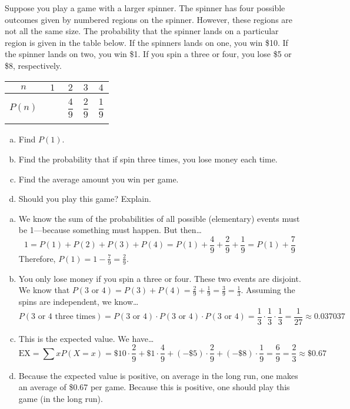 \documentclass[11pt,letterpaper]{article}
\begin{document}

 Suppose you play a game with a larger spinner. The spinner has four possible outcomes given by numbered regions on the spinner. However, these regions are not all the same size. The probability that the spinner lands on a particular region is given in the table below. If the spinners lands on one, you win \$10. If the spinner lands on two, you win \$1. If you spin a three or four, you lose \$5 or \$8, respectively. 
	\begin{table}[!ht]
	\centering 
	\begin{tabular}{|c||c|c|c|c|} \hline 
	$n$ & $1$ & $2$ & $3$ & $4$ \\ \hline 
	$P(n)$ & $\phantom{\dfrac{4\rule{0pt}{2.9ex}}{12\rule[-1.3ex]{0pt}{0pt}}}$ & $\dfrac{4}{9}$ & $\dfrac{2}{9}$ & $\dfrac{1}{9}$ \\ \hline
	\end{tabular}
	\end{table}

\begin{enumerate}[(a)]
\item Find $P(1)$.
\item Find the probability that if spin three times, you lose money each time. 
\item Find the average amount you win per game.
\item Should you play this game? Explain. 
\end{enumerate} \pspace

\sol 
\begin{enumerate}[(a)]
\item We know the sum of the probabilities of all possible (elementary) events must be 1---because something must happen. But then\dots
	\[
	1= P(1) + P(2) + P(3) + P(4)= P(1) + \dfrac{4}{9} + \dfrac{2}{9} + \dfrac{1}{9}= P(1) + \dfrac{7}{9}
	\]
Therefore, $P(1)= 1 - \frac{7}{9}= \frac{2}{9}$. \pspace 

\item You only lose money if you spin a three or four. These two events are disjoint. We know that $P(3 \text{ or } 4)= P(3) + P(4)= \frac{2}{9} + \frac{1}{9}= \frac{3}{9}= \frac{1}{3}$. Assuming the spins are independent, we know\dots
	\[
	P(\text{3 or 4 three times})= P(3 \text{ or } 4) \cdot P(3 \text{ or } 4) \cdot P(3 \text{ or } 4)= \dfrac{1}{3} \cdot \dfrac{1}{3} \cdot \dfrac{1}{3}= \dfrac{1}{27} \approx 0.037037
	\] \pspace

\item This is the expected value. We have\dots
	\[
	\text{EX}= \sum x P(X= x)= \$10 \cdot \dfrac{2}{9} + \$1 \cdot \dfrac{4}{9} + (-\$5) \cdot \dfrac{2}{9} + (-\$8) \cdot \dfrac{1}{9}= \dfrac{6}{9}= \dfrac{2}{3} \approx \$0.67
	\] \pspace

\item Because the expected value is positive, on average in the long run, one makes an average of \$0.67 per game. Because this is positive, one should play this game (in the long run). 
\end{enumerate}
\end{document}
